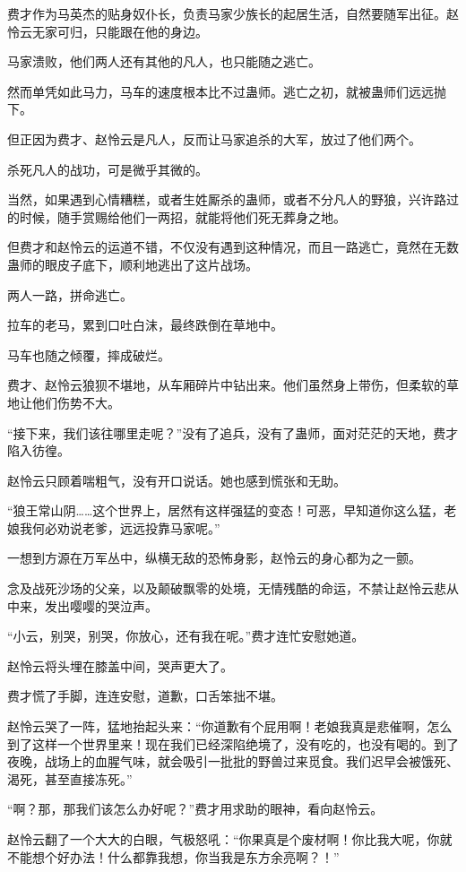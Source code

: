 \begin{this_body}
费才作为马英杰的贴身奴仆长，负责马家少族长的起居生活，自然要随军出征。赵怜云无家可归，只能跟在他的身边。

马家溃败，他们两人还有其他的凡人，也只能随之逃亡。

然而单凭如此马力，马车的速度根本比不过蛊师。逃亡之初，就被蛊师们远远抛下。

但正因为费才、赵怜云是凡人，反而让马家追杀的大军，放过了他们两个。

杀死凡人的战功，可是微乎其微的。

当然，如果遇到心情糟糕，或者生姓厮杀的蛊师，或者不分凡人的野狼，兴许路过的时候，随手赏赐给他们一两招，就能将他们死无葬身之地。

但费才和赵怜云的运道不错，不仅没有遇到这种情况，而且一路逃亡，竟然在无数蛊师的眼皮子底下，顺利地逃出了这片战场。

两人一路，拼命逃亡。

拉车的老马，累到口吐白沫，最终跌倒在草地中。

马车也随之倾覆，摔成破烂。

费才、赵怜云狼狈不堪地，从车厢碎片中钻出来。他们虽然身上带伤，但柔软的草地让他们伤势不大。

“接下来，我们该往哪里走呢？”没有了追兵，没有了蛊师，面对茫茫的天地，费才陷入彷徨。

赵怜云只顾着喘粗气，没有开口说话。她也感到慌张和无助。

“狼王常山阴……这个世界上，居然有这样强猛的变态！可恶，早知道你这么猛，老娘我何必劝说老爹，远远投靠马家呢。”

一想到方源在万军丛中，纵横无敌的恐怖身影，赵怜云的身心都为之一颤。

念及战死沙场的父亲，以及颠破飘零的处境，无情残酷的命运，不禁让赵怜云悲从中来，发出嘤嘤的哭泣声。

“小云，别哭，别哭，你放心，还有我在呢。”费才连忙安慰她道。

赵怜云将头埋在膝盖中间，哭声更大了。

费才慌了手脚，连连安慰，道歉，口舌笨拙不堪。

赵怜云哭了一阵，猛地抬起头来：“你道歉有个屁用啊！老娘我真是悲催啊，怎么到了这样一个世界里来！现在我们已经深陷绝境了，没有吃的，也没有喝的。到了夜晚，战场上的血腥气味，就会吸引一批批的野兽过来觅食。我们迟早会被饿死、渴死，甚至直接冻死。”

“啊？那，那我们该怎么办好呢？”费才用求助的眼神，看向赵怜云。

赵怜云翻了一个大大的白眼，气极怒吼：“你果真是个废材啊！你比我大呢，你就不能想个好办法！什么都靠我想，你当我是东方余亮啊？！”


\end{this_body}
